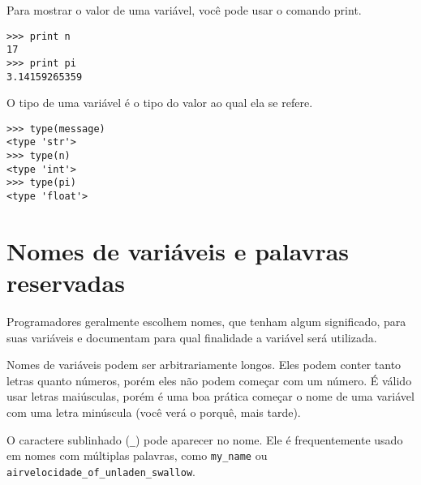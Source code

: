 Para mostrar o valor de uma variável, você pode usar o comando print.

\beforeverb
\begin{verbatim}
>>> print n
17
>>> print pi
3.14159265359
\end{verbatim}
\afterverb
%

O tipo de uma variável é o tipo do valor ao qual ela se refere.

\beforeverb
\begin{verbatim}
>>> type(message)
<type 'str'>
>>> type(n)
<type 'int'>
>>> type(pi)
<type 'float'>
\end{verbatim}
\afterverb
%

\section{Nomes de variáveis e palavras reservadas}


Programadores geralmente escolhem nomes, que tenham algum significado, 
para suas variáveis e documentam para qual finalidade a 
variável será utilizada.

Nomes de variáveis podem ser arbitrariamente longos. Eles podem conter 
tanto letras quanto números, porém eles não podem começar com um número.
É válido usar letras maiúsculas, porém é uma boa prática começar o nome de uma variável 
com uma letra minúscula (você verá o porquê, mais tarde).

O caractere sublinhado (\verb"_") pode aparecer no nome.
Ele é frequentemente usado em nomes com múltiplas palavras, como 
\verb"my_name" ou \verb"airvelocidade_of_unladen_swallow".

